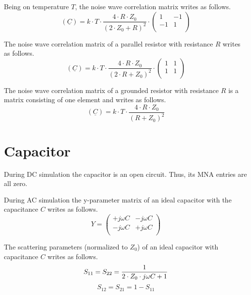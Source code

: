 Being on temperature $T$, the noise wave correlation matrix
writes as follows.
\begin{equation}
(\underline{C}) = k\cdot T\cdot\frac{4\cdot R\cdot Z_0}{(2\cdot Z_0+R)^2}\cdot
\begin{pmatrix}
   1 & -1\\
  -1 &  1\\
\end{pmatrix}
\end{equation}

The noise wave correlation matrix of a parallel resistor with resistance $R$
writes as follows.
\begin{equation}
(\underline{C}) = k\cdot T\cdot\frac{4\cdot R\cdot Z_0}{(2\cdot R+Z_0)^2}\cdot
\begin{pmatrix}
  1 & 1\\
  1 & 1\\
\end{pmatrix}
\end{equation}

The noise wave correlation matrix of a grounded resistor with resistance $R$
is a matrix consisting of one element and writes as follows.
\begin{equation}
(\underline{C}) = k\cdot T\cdot\frac{4\cdot R\cdot Z_0}{(R+Z_0)^2}
\end{equation}


\section{Capacitor}

During DC simulation the capacitor is an open circuit. Thus, its MNA
entries are all zero.

\addvspace{12pt}

During AC simulation the y-parameter matrix of an ideal capacitor
with the capacitance $C$ writes as follows.
\begin{equation}
Y =
\begin{pmatrix}
+j\omega C & -j\omega C\\
-j\omega C & +j\omega C\\
\end{pmatrix}
\end{equation}

The scattering parameters (normalized to $Z_0$) of an ideal capacitor
with capacitance $C$ writes as follows.
\begin{equation}
S_{11} = S_{22} = \frac{1}{2\cdot Z_0\cdot j\omega C+1} \\
\end{equation}
\begin{equation}
S_{12} = S_{21} = 1-S_{11}
\end{equation}

